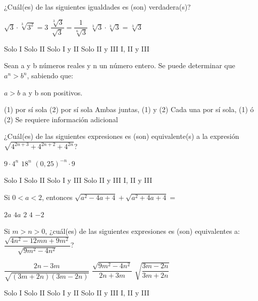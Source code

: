 \documentclass[pagina vacia]{srs}
\begin{document}
\begin{preguntas}
\pregunta ¿Cuál(es) de las siguientes igualdades es (son) verdadera(s)?
\begin{verticali}
\alternativa \(\sqrt{3} \cdot \sqrt[3]{3^2} = 3\)
\alternativa \(\dfrac{\sqrt[3]{3}}{\sqrt{3}} = \dfrac{1}{\sqrt[6]{3}}\)
\alternativa \(\sqrt[3]{3} \cdot \sqrt[3]{3} = \sqrt[3]{3}\)
\end{verticali}
\begin{vertical}
\alternativa Solo I
\alternativa Solo II
\alternativa Solo I y II
\alternativa Solo II y III
\alternativa I, II y III
\end{vertical}

\pregunta Sean a y b números reales y n un número entero. Se puede determinar que \(a^n > b^n\), sabiendo que:
\begin{verticaln}
\alternativa \(a > b\)
\alternativa a y b son positivos.
\end{verticaln}
\begin{vertical}
\alternativa (1) por sí sola
\alternativa (2) por sí sola
\alternativa Ambas juntas, (1) y (2)
\alternativa Cada una por sí sola, (1) ó (2)
\alternativa Se requiere información adicional
\end{vertical}

\pregunta ¿Cuál(es) de las siguientes expresiones es (son) equivalente(s) a la expresión \(\sqrt{4^{2n+3} + 4^{2n+2} + 4^{2n}}\)?
\begin{verticali}
\alternativa \(9 \cdot 4^n\)
\alternativa \(18^n\)
\alternativa \((0,25)^{-n} \cdot 9\)
\end{verticali}
\begin{vertical}
\alternativa Solo I
\alternativa Solo II
\alternativa Solo I y III
\alternativa Solo II y III
\alternativa I, II y III
\end{vertical}

\pregunta Si \(0 < a < 2\), entonces \(\sqrt{a^2-4a+4} + \sqrt{a^2+4a+4} =\)
\begin{vertical}
\alternativa \(2a\)
\alternativa \(4a\)
\alternativa \(2\)
\alternativa \(4\)
\alternativa \(-2\)
\end{vertical}

\pregunta Si \(m>n>0\), ¿cuál(es) de las siguientes expresiones es (son) equivalentes a: \(\dfrac{\sqrt{4n^2 - 12mn + 9m^2}}{\sqrt{9m^2 - 4n^2}}\)?
\begin{verticali}
\alternativa \(\dfrac{2n - 3m}{\sqrt{(3m+2n)(3m-2n)}}\)
\alternativa \(\dfrac{\sqrt{9m^2 - 4n^2}}{2n + 3m}\)
\alternativa \(\sqrt{\dfrac{3m - 2n}{3m + 2n}}\)
\end{verticali}
\begin{vertical}
\alternativa Solo I
\alternativa Solo II
\alternativa Solo I y II
\alternativa Solo II y III
\alternativa I, II y III
\end{vertical}


\end{preguntas}
\end{document}
